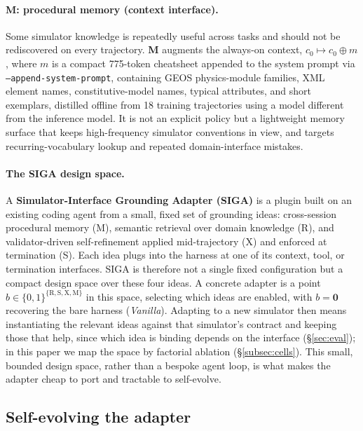 \documentclass{article}
\begin{document}
\paragraph{M: procedural memory (context interface).} Some simulator knowledge is repeatedly useful across tasks and should not be rediscovered on every trajectory. \textbf{M} augments the always-on context, $c_0 \mapsto c_0 \oplus m$, where $m$ is a compact 775-token cheatsheet appended to the system prompt via \texttt{--append-system-prompt}, containing GEOS physics-module families, XML element names, constitutive-model names, typical attributes, and short exemplars, distilled offline from 18 training trajectories using a model different from the inference model. It is not an explicit policy but a lightweight memory surface that keeps high-frequency simulator conventions in view, and targets recurring-vocabulary lookup and repeated domain-interface mistakes.

\paragraph{The SIGA design space.} A \textbf{Simulator-Interface Grounding Adapter (SIGA)} is a plugin built on an existing coding agent from a small, fixed set of grounding ideas: cross-session procedural memory (M), semantic retrieval over domain knowledge (R), and validator-driven self-refinement applied mid-trajectory (X) and enforced at termination (S). Each idea plugs into the harness at one of its context, tool, or termination interfaces. SIGA is therefore not a single fixed configuration but a compact design space over these four ideas. A concrete adapter is a point $b \in \{0,1\}^{\{\mathrm{R,S,X,M}\}}$ in this space, selecting which ideas are enabled, with $b = \mathbf{0}$ recovering the bare harness (\emph{Vanilla}). Adapting to a new simulator then means instantiating the relevant ideas against that simulator's contract and keeping those that help, since which idea is binding depends on the interface (\S\ref{sec:eval}); in this paper we map the space by factorial ablation (\S\ref{subsec:cells}). This small, bounded design space, rather than a bespoke agent loop, is what makes the adapter cheap to port and tractable to self-evolve.

\subsection{Self-evolving the adapter}
\label{subsec:self-evolved}
\end{document}

